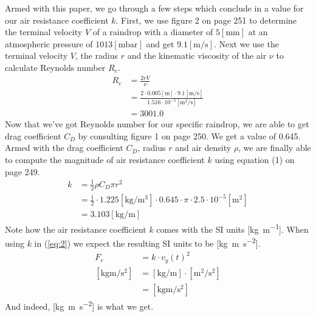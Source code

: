 \documentclass[paper=a4, fontsize=11pt]{scrartcl} %
\numberwithin{equation}{section} %
\numberwithin{figure}{section} %
\numberwithin{table}{section} %
\begin{document}
Armed with this paper, we go through a few steps which conclude in a value for our air resistance coefficient $k$.
First, we use figure 2 on page 251 to determine the terminal velocity $V$ of a raindrop with a diameter of $5[\si{\milli\meter}]$
at an atmospheric pressure of $1013[\si{\milli\bar}]$ and get $9.1[\si{\meter\per\second}]$.
Next we use the terminal velocity $V$, the radius $r$ and the kinematic viscosity of the air $\nu$ to calculate Reynolds number $R_e$.
\begin{align} \label{eq:3}
R_e &= \frac{2rV}{\nu} \\
    &= \frac{2 \cdot 0.005[\si{\meter}] \cdot 9.1 [\si{\meter\per\second}]}{1.516 \cdot 10^{-5}[\si{\meter\squared\per\second}]} \\
    &= 3001.0
\end{align}
Now that we've got Reynolds number for our specific raindrop, we are able to get drag coefficient $C_D$ by consulting figure 1
on page 250. We get a value of 0.645. Armed with the drag coefficient $C_D$, radius $r$ and air density 
$\rho$, we are finally able to compute the magnitude of air resistance coefficient $k$ using equation (1) on page 249.
\begin{align} \label{eq:4}
k &= \frac{1}{2} \rho C_D \pi r^2 \\
  &= \frac{1}{2} \cdot 1.225 [\si{\kilogram\per\meter\cubed}] \cdot 0.645 \cdot \pi \cdot 2.5 \cdot 10^{-5} [\si{\meter\squared}] \\
  &=  3.103 [\si{\kilogram\per\meter}]
\end{align}
Note how the air resistance coefficient $k$ comes with the SI units [\si{\kilogram\per\meter}].
When using $k$ in (\ref{eq:2}) we expect the resulting SI units to be [\si{\kilogram\meter\per\second\squared}].
\begin{align} \label{eq:5}
F_r &= k \cdot v_y(t)^2 \\
[\si{\kilogram\meter\per\second\squared}]  &= [\si{\kilogram\per\meter}] \cdot [\si{\meter\squared\per\second\squared}] \\
  &= [\si{\kilogram\meter\per\second\squared}]
\end{align}
And indeed, [\si{\kilogram\meter\per\second\squared}] is what we get.
\end{document}
